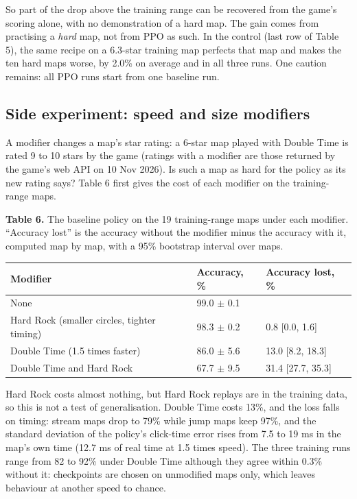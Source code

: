 \documentclass[10pt,a4paper]{article}
\begin{document}
So part of the drop above the training range can be recovered from the game's scoring alone, with no demonstration of a hard map. The gain comes from practising a \textit{hard} map, not from PPO as such. In the control (last row of Table 5), the same recipe on a 6.3-star training map perfects that map and makes the ten hard maps worse, by 2.0\% on average and in all three runs. One caution remains: all PPO runs start from one baseline run.


\subsection{Side experiment: speed and size modifiers}

A modifier changes a map's star rating: a 6-star map played with Double Time is rated 9 to 10 stars by the game (ratings with a modifier are those returned by the game's web API on 10 Nov 2026). Is such a map as hard for the policy as its new rating says? Table 6 first gives the cost of each modifier on the training-range maps.


\begin{table}[!htb]\raggedright {\small \textbf{Table 6.} The baseline policy on the 19 training-range maps under each modifier. ``Accuracy lost'' is the accuracy without the modifier minus the accuracy with it, computed map by map, with a 95\% bootstrap interval over maps.\par}\vspace{3pt}\centering \small\setlength{\tabcolsep}{5pt}\renewcommand{\arraystretch}{1.12}\begin{tabular}{lll}\toprule
Modifier & Accuracy, \% & Accuracy lost, \% \\\midrule
None & 99.0 $\pm$ 0.1 &  \\
Hard Rock (smaller circles, tighter timing) & 98.3 $\pm$ 0.2 & 0.8 [0.0, 1.6] \\
Double Time (1.5 times faster) & 86.0 $\pm$ 5.6 & 13.0 [8.2, 18.3] \\
Double Time and Hard Rock & 67.7 $\pm$ 9.5 & 31.4 [27.7, 35.3] \\\bottomrule\end{tabular}\end{table}

Hard Rock costs almost nothing, but Hard Rock replays are in the training data, so this is not a test of generalisation. Double Time costs 13\%, and the loss falls on timing: stream maps drop to 79\% while jump maps keep 97\%, and the standard deviation of the policy's click-time error rises from 7.5 to 19 ms in the map's own time (12.7 ms of real time at 1.5 times speed). The three training runs range from 82 to 92\% under Double Time although they agree within 0.3\% without it: checkpoints are chosen on unmodified maps only, which leaves behaviour at another speed to chance.
\end{document}
